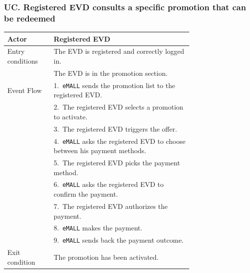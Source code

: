 \subsubsection*{UC\cuc . Registered EVD consults a specific promotion that can be redeemed}
\begin{center}
    \begin{longtable}{lp{0.75\linewidth}}
        \hline
        Actor            & Registered EVD                                                                                                        \\
        \hline
        Entry conditions & The EVD is registered and correctly logged in.                                                                        \\
        & The EVD is in the promotion section.                                                                                  \\
        \hline
        Event Flow       & 1.\ \verb|eMALL| sends the promotion list to the registered EVD.                                                             \\
        & 2.\ The registered EVD selects a promotion to activate.                                                               \\
        & 3.\ The registered EVD triggers the offer.                                                                            \\
        & 4.\ \verb|eMALL| asks the registered EVD to choose between his payment methods.                                              \\
        & 5.\ The registered EVD picks the payment method.                                                                      \\
        & 6.\ \verb|eMALL| asks the registered EVD to confirm the payment.                                                             \\
        & 7.\ The registered EVD authorizes the payment.                                                                        \\
        & 8.\ \verb|eMALL| makes the payment.                                                                                          \\
        & 9.\ \verb|eMALL| sends back the payment outcome.                                                                             \\
        \hline
        Exit condition   & The promotion has been activated.                                                                                     \\

\end{longtable}
\end{center}
